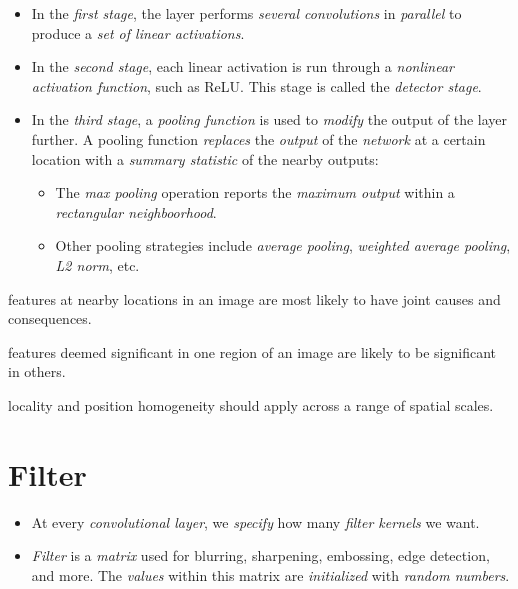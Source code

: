 \documentclass[
	number={9},
	title={Convolutional Neural Network}
]{cs584notes}
\begin{document}
\begin{itemize}
\begin{itemize}
	\end{itemize}
	\item In the \emph{first stage}, the layer performs \emph{several convolutions} in \emph{parallel} to produce a \emph{set of linear activations}.
	\item In the \emph{second stage}, each linear activation is run through a \emph{nonlinear activation function}, such as ReLU\@.
	This stage is called the \emph{detector stage}.
	\item In the \emph{third stage}, a \emph{pooling function} is used to \emph{modify} the output of the layer further.
	A pooling function \emph{replaces} the \emph{output} of the \emph{network} at a certain location with a \emph{summary statistic} of the nearby outputs:
	\begin{itemize}
		\item The \emph{max pooling} operation reports the \emph{maximum output} within a \emph{rectangular neighboorhood}.
		\item Other pooling strategies include \emph{average pooling}, \emph{weighted average pooling}, \emph{L2 norm}, etc.
	\end{itemize}
\end{itemize}

\begin{description}[font=\emph]
	\item[Spatial locality] features at nearby locations in an image are most likely to have joint causes and consequences.
	\item[Spatial position homogeneity] features deemed significant in one region of an image are likely to be significant in others.
	\item[Spatial scale homogeneity] locality and position homogeneity should apply across a range of spatial scales.
\end{description}

\section{Filter}\label{sec:filter}
\begin{itemize}
	\item At every \emph{convolutional layer}, we \emph{specify} how many \emph{filter kernels} we want.
	\item \emph{Filter} is a \emph{matrix} used for blurring, sharpening, embossing, edge detection, and more.
	The \emph{values} within this matrix are \emph{initialized} with \emph{random numbers}.
\end{itemize}
\end{document}
